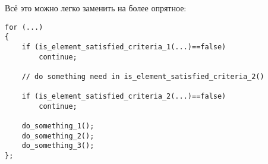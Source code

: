 Всё это можно легко заменить на более опрятное:

\begin{lstlisting}
for (...)
{
	if (is_element_satisfied_criteria_1(...)==false)
		continue;

	// do something need in is_element_satisfied_criteria_2()

	if (is_element_satisfied_criteria_2(...)==false)
		continue;

	do_something_1();
	do_something_2();
	do_something_3();
};
\end{lstlisting}

